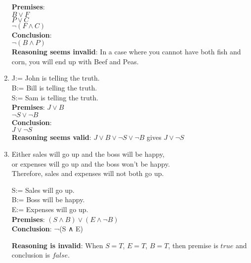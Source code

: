 \begin{questions}
\begin{solution}
\begin{enumerate}
                \textbf{Premises}: \\
                $B \vee F$ \\
                $P \vee C$ \\
                $\neg(F \wedge C)$ \\
                
                \textbf{Conclusion}: \\
                $\neg(B \wedge P)$ \\
                
                \textbf{Reasoning seems invalid}: In a case where you cannot have both fish and corn, you will end up with Beef and Peas.
                
        \item
                J:= John is telling the truth. \\
                B:= Bill is telling the truth.\\
                S:= Sam is telling the truth.\\
                
                \textbf{Premises}:
                $J \vee B$ \\
                $\neg S \vee \neg B$ \\
                
                \textbf{Conclusion}: \\
                $J \vee \neg S$\\
                
                \textbf{Reasoning seems valid}: $J \vee B \vee \neg S \vee \neg B$ gives $J \vee \neg S$
                
        \item
                Either sales will go up and the boss will be happy, \\
                or expenses will go up and the boss won’t be happy.\\
                Therefore, sales and expenses will not both go up.
                
                S:= Sales will go up. \\
                B:= Boss will be happy. \\
                E:= Expenses will go up. \\
                
                \textbf{Premises}:
                $(S \wedge B) \vee (E \wedge \neg B)$ \\
                
                \textbf{Conclusion}:
                ¬(S ∧ E)
                
                \textbf{Reasoning is invalid}: When $S = T$, $E = T$, $B = T$, then premise is $true$ and conclusion is $false$.

        
    \end{enumerate}
\end{solution}

\end{questions}